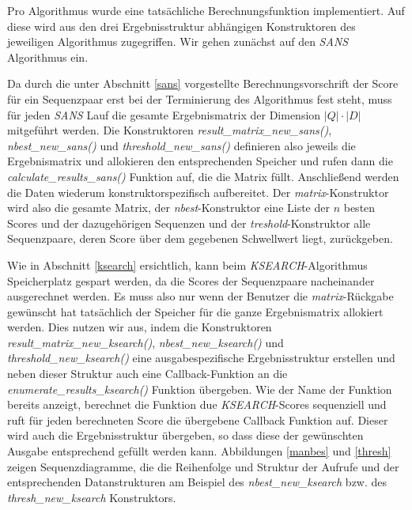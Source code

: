 \documentclass{article}
\begin{document}
Pro Algorithmus wurde eine tatsächliche Berechnungsfunktion implementiert. Auf diese wird aus den drei Ergebnisstruktur abhängigen Konstruktoren des jeweiligen
Algorithmus zugegriffen. Wir gehen zunächst auf den \emph{SANS} Algorithmus ein.

Da durch die unter Abschnitt \ref{sans} vorgestellte Berechnungsvorschrift der
Score für ein Sequenzpaar erst bei der Terminierung des Algorithmus
fest steht, muss für jeden \emph{SANS} Lauf die gesamte Ergebnismatrix der Dimension $|Q|\cdot|D|$ mitgeführt werden. Die Konstruktoren 
\emph{result\_matrix\_new\_sans()}, \emph{nbest\_new\_sans()} und  \emph{threshold\_new\_sans()} definieren also jeweils die Ergebnismatrix und allokieren
den entsprechenden Speicher und rufen dann die \emph{calculate\_results\_sans()} Funktion auf, die die Matrix füllt. Anschließend werden die Daten 
wiederum konstruktorspezifisch aufbereitet. Der \emph{matrix}-Konstruktor wird also die gesamte Matrix, der \emph{nbest}-Konstruktor eine
Liste der $n$ besten Scores und der dazugehörigen Sequenzen und der \emph{treshold}-Konstruktor alle Sequenzpaare, deren Score über dem gegebenen
Schwellwert liegt, zurückgeben.

Wie in Abschnitt \ref{ksearch} ersichtlich, kann beim \emph{KSEARCH}-Algorithmus Speicherplatz gespart werden, da die Scores der Sequenzpaare
nacheinander ausgerechnet werden. Es muss also nur wenn der Benutzer die \emph{matrix}-Rückgabe gewünscht hat tatsächlich der Speicher für die
ganze Ergebnismatrix allokiert werden. Dies nutzen wir aus, indem die Konstruktoren \emph{result\_matrix\_new\_ksearch()}, \emph{nbest\_new\_ksearch()} 
und  \emph{threshold\_new\_ksearch()} eine ausgabespezifische Ergebnisstruktur erstellen und neben dieser Struktur auch eine Callback-Funktion an 
die \emph{enumerate\_results\_ksearch()} Funktion übergeben. Wie der Name der Funktion bereits anzeigt, berechnet die Funktion due \emph{KSEARCH}-Scores
sequenziell und ruft für jeden berechneten Score die übergebene Callback Funktion auf. Dieser wird auch die Ergebnisstruktur übergeben, so dass diese
der gewünschten Ausgabe entsprechend gefüllt werden kann. Abbildungen
\ref{manbes} und \ref{thresh} zeigen Sequenzdiagramme, die die
Reihenfolge und Struktur der Aufrufe und der entsprechenden Datanstrukturen am
Beispiel des \emph{nbest\_new\_ksearch} bzw. des \emph{thresh\_new\_ksearch} Konstruktors.

\end{document}
